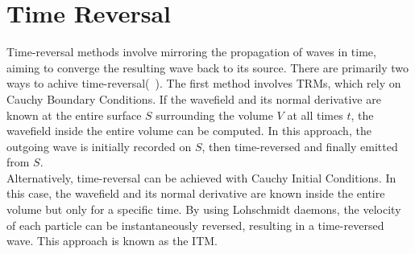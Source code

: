 \chapter{Time Reversal}

Time-reversal methods involve mirroring the propagation of waves in time, aiming to converge the resulting wave back to its source.
There are primarily two ways to achive time-reversal(~\parencite{Fink2017}). The first method involves \ac{TRM}s, which rely on 
Cauchy Boundary Conditions. If the wavefield and its normal derivative are known at the entire surface $S$ surrounding the volume
$V$ at all times $t$, the wavefield inside the entire volume can be computed. In this approach, the outgoing wave is initially 
recorded on $S$, then time-reversed and finally emitted from $S$. \\

Alternatively, time-reversal can be achieved with Cauchy Initial Conditions. In this case, the wavefield and its normal derivative
are known inside the entire volume but only for a specific time. By using Lohschmidt daemons, the velocity of each particle can be
instantaneously reversed, resulting in a time-reversed wave. This approach is known as the \ac{ITM}.